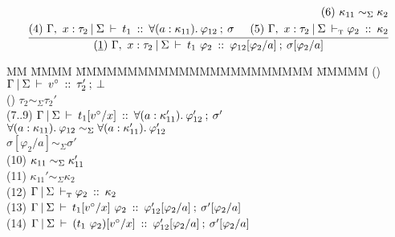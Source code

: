 \begin{flushleft}
\clearpage{}
$$
\frac
	{ \begin{aligned}
	  \\
	  (4) \ \Gamma, \ x : \tau_2 \: \arrowvert \: \Sigma \: \vdash \: t_1 \: :: \: \forall(a : \kappa_{11}). \: \varphi_{12} \: ; \: \sigma 
	  \end{aligned}
	  \hspace{0.5cm}
	  \begin{aligned}
	  (6) \ \kappa_{11} \sim_\Sigma \kappa_2
	  \\
	  (5) \ \Gamma, \ x : \tau_2 \: \arrowvert \: \Sigma \: \vdash_\textrm{\tiny{T}}\varphi_2 \: :: \: \kappa_2
	  \end{aligned}
	}
	{ (\underline{1}) \ \Gamma, \ x : \tau_2 \: \arrowvert \: \Sigma \: \vdash \: t_1 \ \varphi_2 \: :: \: \varphi_{12}[\varphi_2/a] \: ; \: \sigma[\varphi_2/a] 
	}
$$
\begin{tabbing}
MM \= MMMM \= MMMMMMMMMMMMMMMMMMMMMMM \= MMMMM  \kill
\>	()	\> $\Gamma \: \arrowvert \: \Sigma \: \vdash \: v^\circ \: :: \: \tau_2' \: ; \: \bot$
			\>  
\\[1ex]
\>	()	\> $\tau_2 \sim_\Sigma \tau_2'$
			\> 
\\[1ex]
\>	(7..9)		\> $\Gamma \: \arrowvert \: \Sigma \: \vdash \: t_1[v^\circ/x] \: :: \: \forall(a : \kappa_{11}'). \: \varphi_{12}' \: ; \: \sigma'$
\\[0.2ex]
\>			\> \qq 	$\forall(a : \kappa_{11}). \: \varphi_{12}
				\sim_\Sigma
				\forall(a : \kappa_{11}'). \: \varphi_{12}'$
\\[0.2ex]
\>			\> \qq	$\sigma[\varphi_2/a] \sim_\Sigma \sigma'$
			\> 
\\[1ex]
\>	(10)		\> $\kappa_{11}  \sim_\Sigma \kappa_{11}'$
			\> 
\\[1ex]
\>	(11) 		\> $\kappa_{11}' \sim_\Sigma \kappa_2$
			\> 
\\[1ex]
\>	(12) 		\> $\Gamma \: \arrowvert \: \Sigma \: \vdash_\textrm{\tiny{T}}\varphi_2 \: :: \: \kappa_2 $
			\> 
\\[1ex]
\>	(13) 		\> $\Gamma \: \arrowvert \: \Sigma \: \vdash \: t_1[v^\circ/x] \ \varphi_2 \: :: \: \varphi_{12}'[\varphi_2/a] \: ; \: \sigma'[\varphi_2/a]$
			\> 
\\[1ex]
\>	(14) 		\> $\Gamma \: \arrowvert \: \Sigma \: \vdash \: (t_1 \ \varphi_2)[v^\circ/x] \: :: \: \varphi_{12}'[\varphi_2/a] \: ; \: \sigma'[\varphi_2/a]$
			\> 
\end{tabbing}
\bigskip



\end{flushleft}
